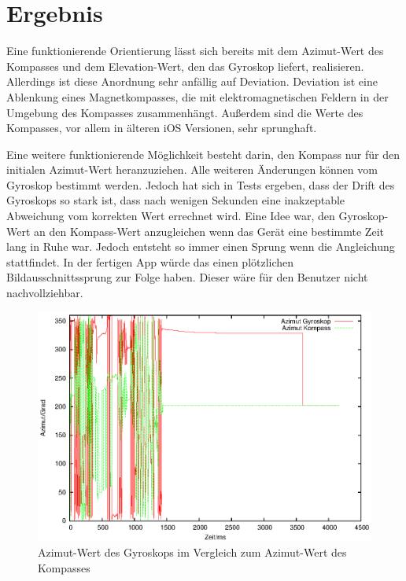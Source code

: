 
\chapter{Ergebnis}
  \label{Ergebnis}

Eine funktionierende Orientierung lässt sich bereits mit dem Azimut-Wert des Kompasses und dem Elevation-Wert, den das Gyroskop liefert, realisieren. Allerdings ist diese Anordnung sehr anfällig auf Deviation. Deviation ist eine Ablenkung eines Magnetkompasses, die mit elektromagnetischen Feldern in der Umgebung des Kompasses zusammenhängt. Außerdem sind die Werte des Kompasses, vor allem in älteren iOS Versionen, sehr sprunghaft. 

Eine weitere funktionierende Möglichkeit besteht darin, den Kompass nur für den initialen Azimut-Wert heranzuziehen. Alle weiteren Änderungen können vom Gyroskop bestimmt werden. Jedoch hat sich in Tests ergeben, dass der Drift des Gyroskops so stark ist, dass nach wenigen Sekunden eine inakzeptable Abweichung vom korrekten Wert errechnet wird. Eine Idee war, den Gyroskop-Wert an den Kompass-Wert anzugleichen wenn das Gerät eine bestimmte Zeit lang in Ruhe war. Jedoch entsteht so immer einen Sprung wenn die Angleichung stattfindet. In der fertigen App würde das einen plötzlichen Bildausschnittssprung zur Folge haben. Dieser wäre für den Benutzer nicht nachvollziehbar.

\begin{figure}[htb]
\centering
\includegraphics[scale=1]{figures/heading004}
\caption{Azimut-Wert des Gyroskops im Vergleich zum Azimut-Wert des Kompasses}
\label{fig:heading004}
\end{figure}

